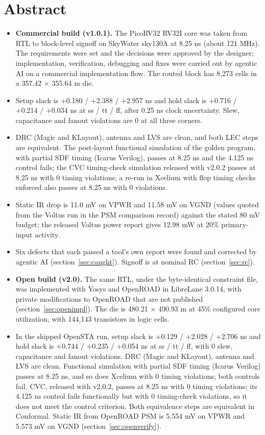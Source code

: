 \documentclass[11pt,letterpaper]{article}
\renewcommand{\_}{\textunderscore\penalty0\hskip0pt\relax}
\begin{document}
\section*{Abstract}
\begin{itemize}
\item \textbf{Commercial build (v1.0.1).} The PicoRV32 RV32I core was taken from RTL to block-level signoff on SkyWater sky130A at 8.25 ns (about 121 MHz). The requirements were set and the decisions were approved by the designer; implementation, verification, debugging and fixes were carried out by agentic AI on a commercial implementation flow. The routed block has 8,273 cells in a 357.42 $\times$ 355.64 \textmu m die.
\item Setup slack is +0.180 / +2.388 / +2.957 ns and hold slack is +0.716 / +0.214 / +0.034 ns at ss / tt / ff, after 0.25 ns clock uncertainty. Slew, capacitance and fanout violations are 0 at all three corners.
\item DRC (Magic and KLayout), antenna and LVS are clean, and both LEC steps are equivalent. The post-layout functional simulation of the golden program, with partial SDF timing (Icarus Verilog), passes at 8.25 ns and the 4.125 ns control fails; the CVC timing-check simulation released with v2.0.2 passes at 8.25 ns with 0 timing violations; a re-run in Xcelium with flop timing checks enforced also passes at 8.25 ns with 0 violations.
\item Static IR drop is 11.0 mV on VPWR and 11.58 mV on VGND (values quoted from the Voltus run in the PSM comparison record) against the stated 80 mV budget; the released Voltus power report gives 12.98 mW at 20\% primary-input activity.
\item Six defects that each passed a tool's own report were found and corrected by agentic AI (section~\ref{sec:caught}). Signoff is at nominal RC (section~\ref{sec:rc}).
\item \textbf{Open build (v2.0).} The same RTL, under the byte-identical constraint file, was implemented with Yosys and OpenROAD in LibreLane 3.0.14, with private modifications to OpenROAD that are not published (section~\ref{sec:openimpl}). The die is 480.21 $\times$ 490.93 \textmu m at 45\% configured core utilization, with 144,143 transistors in logic cells.
\item In the shipped OpenSTA run, setup slack is +0.129 / +2.028 / +2.706 ns and hold slack is +0.744 / +0.235 / +0.054 ns at ss / tt / ff, with 0 slew, capacitance and fanout violations. DRC (Magic and KLayout), antenna and LVS are clean. Functional simulation with partial SDF timing (Icarus Verilog) passes at 8.25 ns, and so does Xcelium with 0 timing violations; both controls fail. CVC, released with v2.0.2, passes at 8.25 ns with 0 timing violations; its 4.125 ns control fails functionally but with 0 timing-check violations, so it does not meet the control criterion. Both equivalence steps are equivalent in Conformal. Static IR from OpenROAD PSM is 5.554 mV on VPWR and 5.573 mV on VGND (section~\ref{sec:openverify}).

\end{itemize}
\end{document}
